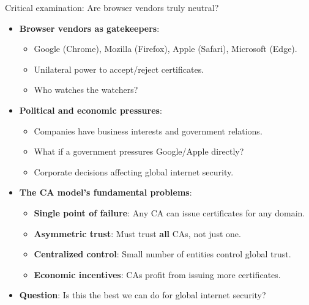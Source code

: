 \documentclass[aspectratio=169, lualatex, handout]{beamer}
\begin{document}
\begin{frame}{Critical examination: Are browser vendors truly neutral?}
	\begin{itemize}[<+->]
		\item \textbf{Browser vendors as gatekeepers}:
		      \begin{itemize}
			      \item Google (Chrome), Mozilla (Firefox), Apple (Safari), Microsoft (Edge).
			      \item Unilateral power to accept/reject certificates.
			      \item Who watches the watchers?
		      \end{itemize}
		\item \textbf{Political and economic pressures}:
		      \begin{itemize}
			      \item Companies have business interests and government relations.
			      \item What if a government pressures Google/Apple directly?
			      \item Corporate decisions affecting global internet security.
		      \end{itemize}
		\item \textbf{The CA model's fundamental problems}:
		      \begin{itemize}
			      \item \textbf{Single point of failure}: Any CA can issue certificates for any domain.
			      \item \textbf{Asymmetric trust}: Must trust \textbf{all} CAs, not just one.
			      \item \textbf{Centralized control}: Small number of entities control global trust.
			      \item \textbf{Economic incentives}: CAs profit from issuing more certificates.
		      \end{itemize}
		\item \textbf{Question}: Is this the best we can do for global internet security?
	\end{itemize}
\end{frame}
\end{document}
